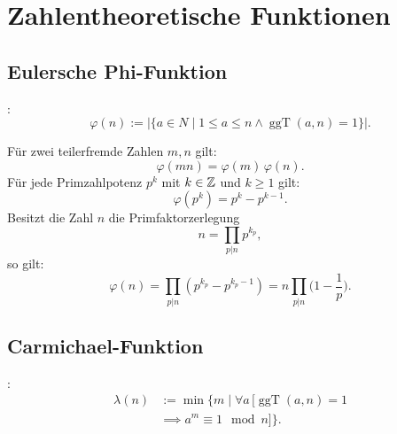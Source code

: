 \section{Zahlentheoretische Funktionen}
\subsection{Eulersche Phi-Funktion}

\begin{Definition}
:
\begin{equation}
\varphi(n) := |\{a\in N\mid 1\le a\le n\wedge\operatorname{ggT}(a,n)=1\}|.
\end{equation}
\end{Definition}
\noindent
Für zwei teilerfremde Zahlen $m,n$ gilt:
\begin{equation}
\varphi(mn) = \varphi(m)\,\varphi(n).
\end{equation}
Für jede Primzahlpotenz $p^k$ mit $k\in\mathbb Z$ und $k\ge 1$ gilt:
\begin{equation}
\varphi(p^k) = p^k-p^{k-1}.
\end{equation}
Besitzt die Zahl $n$ die Primfaktorzerlegung
\begin{equation}
n=\prod_{p|n} p^{k_p},
\end{equation}
so gilt:
\begin{equation}
\varphi(n) = \prod_{p|n} (p^{k_p}-p^{k_p-1})
= n\prod_{p|n} \Big(1-\frac{1}{p}\Big).
\end{equation}

\subsection{Carmichael-Funktion}
\begin{Definition} :
\begin{equation}
\begin{split}
\lambda(n) &:= \min\{m\mid \forall a\,[\operatorname{ggT}(a,n)=1\\
&\implies a^m\equiv 1\mod n]\}.
\end{split}
\end{equation}
\end{Definition}
